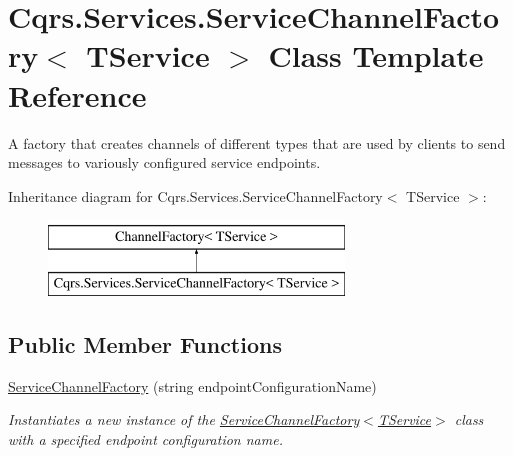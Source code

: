 \hypertarget{classCqrs_1_1Services_1_1ServiceChannelFactory}{}\section{Cqrs.\+Services.\+Service\+Channel\+Factory$<$ T\+Service $>$ Class Template Reference}
\label{classCqrs_1_1Services_1_1ServiceChannelFactory}


A factory that creates channels of different types that are used by clients to send messages to variously configured service endpoints.  


Inheritance diagram for Cqrs.\+Services.\+Service\+Channel\+Factory$<$ T\+Service $>$\+:\begin{figure}[H]
\begin{center}
\leavevmode
\includegraphics[height=2.000000cm]{classCqrs_1_1Services_1_1ServiceChannelFactory}
\end{center}
\end{figure}
\subsection*{Public Member Functions}
\begin{DoxyCompactItemize}
\item 
\hyperlink{classCqrs_1_1Services_1_1ServiceChannelFactory_a8b483162bcc271fa8212c72e13e28f55_a8b483162bcc271fa8212c72e13e28f55}{Service\+Channel\+Factory} (string endpoint\+Configuration\+Name)
\begin{DoxyCompactList}\small\item\em Instantiates a new instance of the \hyperlink{classCqrs_1_1Services_1_1ServiceChannelFactory_a8b483162bcc271fa8212c72e13e28f55_a8b483162bcc271fa8212c72e13e28f55}{Service\+Channel\+Factory$<$\+T\+Service$>$} class with a specified endpoint configuration name. \end{DoxyCompactList}\end{DoxyCompactItemize}
